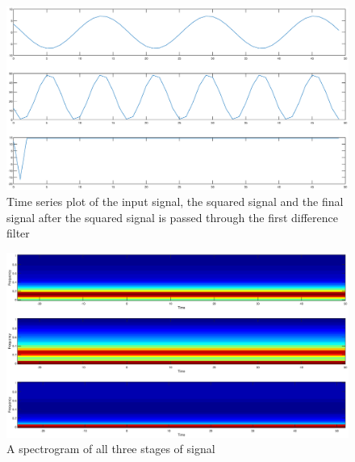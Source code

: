 \documentclass{article}
\begin{document}
\begin{figure}[H]
	\centering
	\includegraphics[scale=0.25]{fig11}
	\caption{Time series plot of the input signal, the squared signal and the final signal after the squared signal is passed through the first difference filter}
\end{figure}

\begin{figure}[H]
	\centering
	\includegraphics[scale=0.25]{fig12}
	\caption{A spectrogram of all three stages of signal}
\end{figure}
\end{document}

